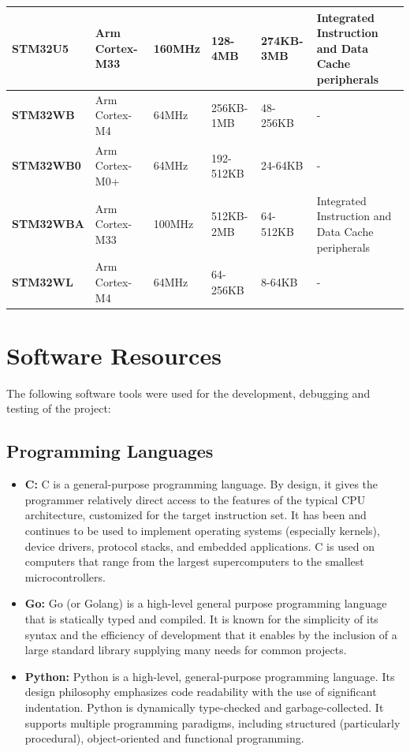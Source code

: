\begin{xltabular}{\linewidth}{@{}>{\bfseries}l X@{} X@{} X@{} X@{} X@{}}
	\midrule
	STM32U5 &
	Arm Cortex-M33 &
	160MHz & 128-4MB & 274KB-3MB & Integrated Instruction and Data Cache peripherals \\
	\midrule
	STM32WB &
	Arm Cortex-M4 &
	64MHz & 256KB-1MB & 48-256KB & - \\
	\midrule
	STM32WB0 &
	Arm Cortex-M0+ &
	64MHz & 192-512KB & 24-64KB & - \\
	\midrule
	STM32WBA &
	Arm Cortex-M33 &
	100MHz & 512KB-2MB & 64-512KB & Integrated Instruction and Data Cache peripherals \\
	\midrule
	STM32WL &
	Arm Cortex-M4 &
	64MHz & 64-256KB & 8-64KB & - \\
	
\end{xltabular}

\section{Software Resources}
The following software tools were used for the  development, debugging and testing of the project:
\subsection{Programming Languages}
\begin{itemize}
	\item \textbf{C:}
	 C is a general-purpose programming language. By design, it gives the programmer relatively direct access to the features of the typical CPU architecture, customized for the target instruction set. It has been and continues to be used to implement operating systems (especially kernels), device drivers, protocol stacks, and embedded applications. C is used on computers that range from the largest supercomputers to the smallest microcontrollers. 
	\item \textbf{Go:}
	 Go (or Golang) is a high-level general purpose programming language that is statically typed and compiled. It is known for the simplicity of its syntax and the efficiency of development that it enables by the inclusion of a large standard library supplying many needs for common projects.
	\item \textbf{Python:}
	 Python is a high-level, general-purpose programming language. Its design philosophy emphasizes code readability with the use of significant indentation.
	 Python is dynamically type-checked and garbage-collected. It supports multiple programming paradigms, including structured (particularly procedural), object-oriented and functional programming. 
\end{itemize}
